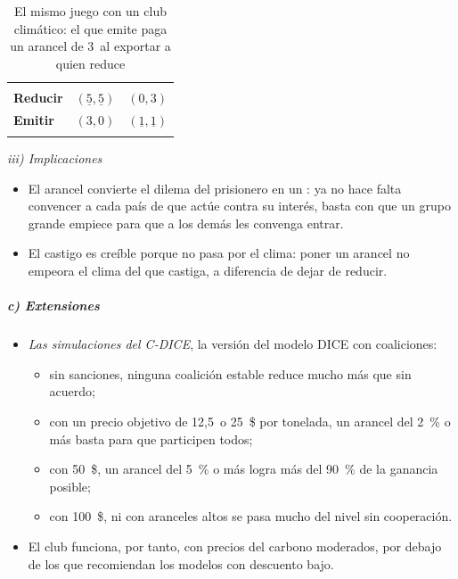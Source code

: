 \documentclass[11pt]{article}
\begin{document}
\begin{table}[H]
\centering
\caption{El mismo juego con un club climático: el que emite paga un arancel de 3~al exportar a quien reduce}\label{tab:club-clima}
\begin{tabular}{>{\centering\arraybackslash}m{2.4cm}|>{\centering\arraybackslash}m{2.6cm}|>{\centering\arraybackslash}m{2.6cm}|}
\multicolumn{1}{c}{} & \multicolumn{1}{c}{\textbf{Reducir}} & \multicolumn{1}{c}{\textbf{Emitir}}\\
\hhline{~|-|-|}
\textbf{Reducir} & \cellcolor{tceesalvia}$(\underline{5},\underline{5})$ & $(0,3)$\\
\hhline{~|-|-|}
\textbf{Emitir} & $(3,0)$ & \cellcolor{tceesalvia}$(\underline{1},\underline{1})$\\
\hhline{~|-|-|}
\end{tabular}
\end{table}

\hspace*{3.6em}\emph{iii) Implicaciones}

\begin{itemize}
\item El arancel convierte el dilema del prisionero en un : ya no hace falta convencer a cada país de que actúe contra su interés, basta con que un grupo grande empiece para que a los demás les convenga entrar.
\item El castigo es creíble porque no pasa por el clima: poner un arancel no empeora el clima del que castiga, a diferencia de dejar de reducir.
\end{itemize}

\subparagraph{c) Extensiones}

\begin{itemize}
\item \emph{Las simulaciones del C-DICE}, la versión del modelo DICE con coaliciones\nocite{Nordhaus2015Climate}:
  \begin{itemize}
  \item sin sanciones, ninguna coalición estable reduce mucho más que sin acuerdo;
  \item con un precio objetivo de 12,5~o 25~\$ por tonelada, un arancel del 2~\% o más basta para que participen todos;
  \item con 50~\$, un arancel del 5~\% o más logra más del 90~\% de la ganancia posible;
  \item con 100~\$, ni con aranceles altos se pasa mucho del nivel sin cooperación.
  \end{itemize}
\item El club funciona, por tanto, con precios del carbono moderados, por debajo de los que recomiendan los modelos con descuento bajo.
\end{itemize}
\end{document}
